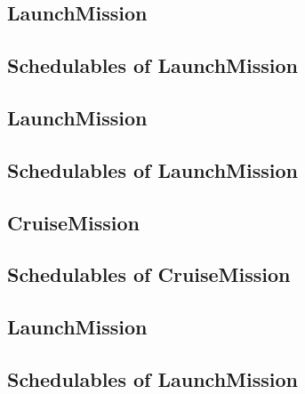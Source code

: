 \documentclass[10pt,a4paper]{article}
\begin{document}

\newpage


\newpage


\subsection{LaunchMission}

\newpage

\subsection{Schedulables of LaunchMission}


\newpage


\subsection{LaunchMission}

\newpage

\subsection{Schedulables of LaunchMission}


\newpage


\subsection{CruiseMission}

\newpage

\subsection{Schedulables of CruiseMission}


\newpage


\newpage


\newpage


\subsection{LaunchMission}

\newpage

\subsection{Schedulables of LaunchMission}
\end{document}
